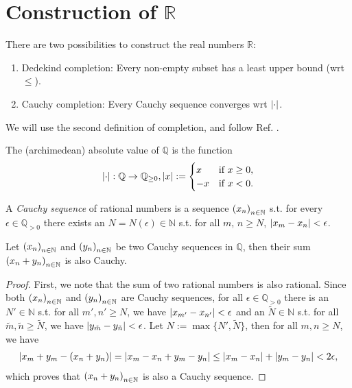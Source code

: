\section{Construction of $\mathbb R$}\label{app:completion_Q}

There are two possibilities to construct the real numbers $\mathbb R$:
\begin{enumerate}
	\item Dedekind completion: Every non-empty subset has a least upper bound (wrt $\leq$).
	\item Cauchy completion: Every Cauchy sequence converges wrt $\abs{\cdot}$.
\end{enumerate}

We will use the second definition of completion, and follow Ref. \cite{src:completion_of_Q,src:cauchy_construction_R}.

\begin{defn}
	The (archimedean) absolute value of $\mathbb Q$ is the function 
	\begin{align}
		\abs{\cdot}: \mathbb Q\to\mathbb{Q}_{\geq 0}, \abs{x} := \begin{cases}
			x &\text{if}\ x \geq 0,
			\\ -x &\text{if}\ x < 0.
		\end{cases}
	\end{align}
\end{defn}

\begin{defn}
	A \textit{Cauchy sequence} of rational numbers is a sequence $\seq[x_n]$ s.t. for every $\epsilon\in\mathbb{Q}_{> 0}$ there exists an $N = N(\epsilon)\in\mathbb N$ s.t. for all $m$, $n\geq N$, $\abs{x_m - x_n} < \epsilon$.
\end{defn}

\begin{theorem}\label{thrm:sum_Cauchy_sequences_Cauchy}
	Let $\seq[x_n]$ and $\seq[y_n]$ be two Cauchy sequences in $\mathbb Q$, then their sum $\seq[x_n + y_n]$ is also Cauchy.
\end{theorem}

\begin{proof}
	First, we note that the sum of two rational numbers is also rational. Since both $\seq[x_n]$ and $\seq[y_n]$ are Cauchy sequences, for all $\epsilon\in\mathbb Q_{>0}$ there is an $N'\in\mathbb N$ s.t. for all $m', n'\geq N$, we have $\abs{x_{m'} - x_{n'}} < \epsilon$ and an $\tilde{N}\in\mathbb N$ s.t. for all $\tilde{m}, \tilde{n}\geq \tilde{N}$, we have $\abs{y_{\tilde{m}} - y_{\tilde{n}}} < \epsilon$. Let $N := \max\{N', \tilde{N}\}$, then for all $m, n\geq N$, we have
	\begin{align*}
		\abs{x_m + y_m - (x_n + y_n)} = \abs{x_m - x_n + y_m - y_n} \leq \abs{x_m - x_n} + \abs{y_m - y_n} < 2\epsilon,
	\end{align*}
	which proves that $\seq[x_n + y_n]$ is also a Cauchy sequence.
\end{proof}

